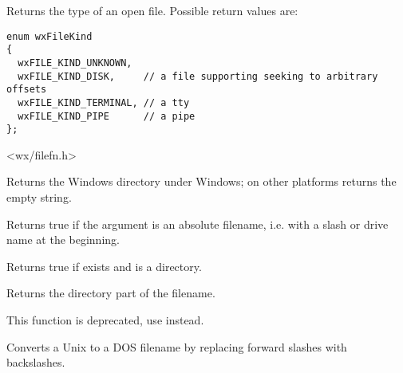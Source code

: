 \label{wxgetfilekind}



Returns the type of an open file. Possible return values are:

\begin{verbatim}
enum wxFileKind
{
  wxFILE_KIND_UNKNOWN,
  wxFILE_KIND_DISK,     // a file supporting seeking to arbitrary offsets
  wxFILE_KIND_TERMINAL, // a tty
  wxFILE_KIND_PIPE      // a pipe
};

\end{verbatim}


<wx/filefn.h>


\label{wxgetosdirectory}


Returns the Windows directory under Windows; on other platforms returns the empty string.


\label{wxisabsolutepath}


Returns true if the argument is an absolute filename, i.e. with a slash
or drive name at the beginning.


\label{functionwxdirexists}


Returns true if  exists and is a directory.


\label{wxpathonly}


Returns the directory part of the filename.


\label{wxunix2dosfilename}


This function is deprecated, use  instead.

Converts a Unix to a DOS filename by replacing forward
slashes with backslashes.


\label{wxchangeumask}

